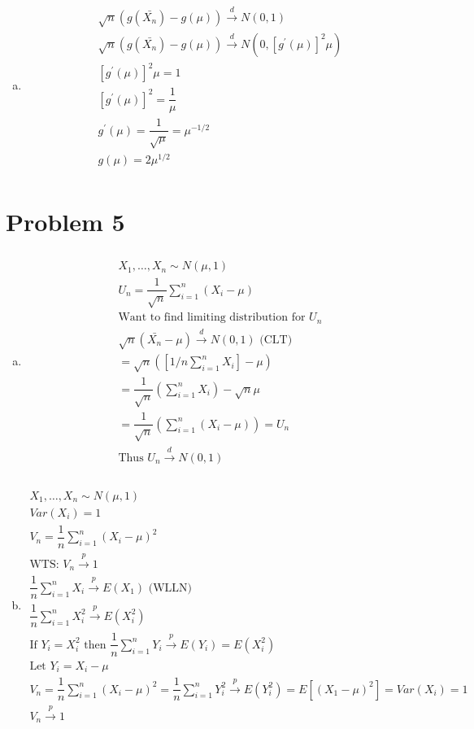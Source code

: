 \documentclass{article}
\newcommand{\cp}{\overset{p}{\to}}
\begin{document}
\begin{flushleft}
\begin{enumerate}[(a)]
	\item 
\begin{multline*}\\
\sqrt{n}(g(\bar{X_n})-g(\mu))\overset{d}{\to}N(0,1)\\
\sqrt{n}(g(\bar{X_n})-g(\mu))\overset{d}{\to}N(0,[g^{'}(\mu)]^2\mu)\\
[g^{'}(\mu)]^2\mu=1\\
[g^{'}(\mu)]^2=\dfrac{1}{\mu}\\
g^{'}(\mu)=\dfrac{1}{\sqrt{\mu}}=\mu^{-1/2}\\
g(\mu)=2\mu^{1/2}\\
\end{multline*}

\end{enumerate}

	\section*{Problem 5}
\begin{enumerate}[(a)]
	
	\item 
\begin{multline*}\\
X_1,\dots,X_n \sim N(\mu,1)\\
U_n=\dfrac{1}{\sqrt{n}}\sum_{i=1}^{n}(X_i-\mu)\\
\text{Want to find limiting distribution for } U_n\\
\sqrt{n}(\bar{X_n}-\mu) \overset{d}{\to}N(0,1) \text{ (CLT)}\\
=\sqrt{n}\left(\left[1/n\sum_{i=1}^{n}X_i\right]-\mu\right)\\
=\dfrac{1}{\sqrt{n}}\left(\sum_{i=1}^{n}X_i\right)-\sqrt{n}\mu\\
=\dfrac{1}{\sqrt{n}}\left(\sum_{i=1}^{n}(X_i-\mu)\right)=U_n\\
\text{Thus } U_n \overset{d}{\to} N(0,1)\\
\end{multline*}

	\item 
\begin{multline*}\\
X_1,\dots,X_n\sim N(\mu,1)\\
Var(X_i)=1\\
V_n=\dfrac{1}{n}\sum_{i=1}^{n}(X_i-\mu)^2\\
\text{WTS: } V_n \overset{p}{\to}1\\
\dfrac{1}{n}\sum_{i=1}^{n}X_i\overset{p}{\to}E(X_1) \text{ (WLLN)}\\
\dfrac{1}{n}\sum_{i=1}^{n}X_i^2\overset{p}{\to}E(X_i^2)\\
\text{If } Y_i=X_i^2 \text{ then } \dfrac{1}{n}\sum_{i=1}^{n}Y_i \cp E(Y_i)=E(X_i^2) \\
\text{Let } Y_i=X_i-\mu\\
V_n=\dfrac{1}{n}\sum_{i=1}^{n}(X_i-\mu)^2=\dfrac{1}{n}\sum_{i=1}^{n}Y_i^2\overset{p}{\to}E(Y_i^2)=E[(X_1-\mu)^2]=Var(X_i)=1\\
V_n \cp 1\\
\end{multline*}


\end{enumerate}
\end{flushleft}
\end{document}
